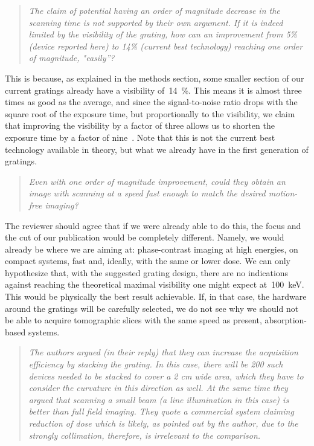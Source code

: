 \documentclass[a4paper,english]{scrartcl}
\newenvironment{reviewerquote}{\begin{quote}\itshape}{\end{quote}}
\begin{document}
\begin{reviewerquote}
The claim of potential having an order of magnitude decrease in
the scanning time is not supported by their own argument. If it is indeed
limited by the visibility of the grating, how can an improvement from 5\%
(device reported here) to 14\% (current best technology) reaching one order
of magnitude, "easily”? 
\end{reviewerquote}

This is because, as explained in the methods section, some
smaller section of our current gratings already have a visibility
of~\SI{14}{\percent}. 
This means it is almost three times as good as the average, and since the
signal-to-noise ratio drops with the square root of the exposure time, but
proportionally to the visibility, we claim that improving the visibility by
a factor of three allows us to shorten the exposure time by a factor of
nine~\cite{Raupach2011}.
Note that this is not the current best technology
available in theory, but what we already have in the first generation of
gratings.              

\begin{reviewerquote}
Even with one order of magnitude improvement, could they obtain
an image with scanning at a speed fast enough to match the desired
motion-free imaging?
\end{reviewerquote}

The reviewer should agree that if we were already able to do
this, the focus and the cut of our publication would be completely
different. Namely, we would already be where we are aiming at:
phase-contrast imaging at high energies, on compact systems, fast and,
ideally, with the 
same or lower dose. We can only hypothesize that, with the suggested grating
design, there are no indications against reaching the theoretical maximal
visibility one might expect at~\SI{100}{\kilo\eV}. This would be physically the best
result achievable. If, in that case, the hardware around the gratings will
be carefully selected, we do not see why we should not be able to acquire
tomographic slices with the same speed as present, absorption-based systems.

\begin{reviewerquote}
The authors argued (in their reply) that they can increase the
acquisition efficiency by stacking the grating. In this case, there will be
200 such devices needed to be stacked to cover a 2 cm wide area, which they
have to consider the curvature in this direction as well. At the same time
they argued that scanning a small beam (a line illumination in this case) is
better than full field imaging. They quote a commercial system claiming
reduction of dose which is likely, as pointed out by the author, due to the
strongly collimation, therefore, is irrelevant to the comparison.
\end{reviewerquote}
\end{document}
